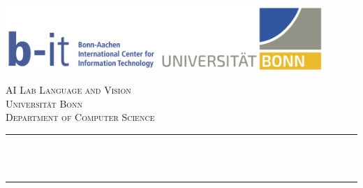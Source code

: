 \begin{titlepage}

\newcommand{\HRule}{\rule{\linewidth}{0.5mm}} %


\includegraphics[width=0.9\textwidth]{title/Logo.png}\\[1cm] 
 

\center %


\textsc{\LARGE AI Lab Language and Vision}\\[1.5cm] %
\textsc{\Large Universit\"at Bonn}\\[0.5cm] %
\textsc{\large Department of Computer Science}\\[0.5cm] %

\makeatletter
\HRule \\[0.4cm]
{ \huge \bfseries \@title}\\[0.4cm] %
\HRule \\[1.5cm]
 


\end{titlepage}
